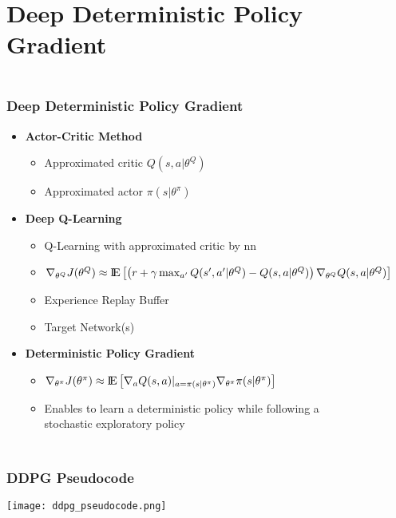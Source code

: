 \documentclass[accentcolor=tud1d,colorbacktitle,inverttitle,landscape,german,presentation,t]{tudbeamer}
\begin{document}
\section{Deep Deterministic Policy Gradient}
	\begin{frame}
		\frametitle{\\Deep Deterministic Policy Gradient}
		\begin{itemize}
			\item \textbf{Actor-Critic Method}
			\begin{itemize}
				\item Approximated critic $Q(s,a|\theta^Q)$
				\item Approximated actor $\pi(s|\theta^\pi)$
			\end{itemize}
			\vspace{2mm}
			\item \textbf{Deep Q-Learning}
			\begin{itemize}
				\item Q-Learning with approximated critic by nn
				\item $\nabla_{\theta^Q}J(\theta^Q)\approx{\rm I\!E} \left[\left(r+\gamma \max_{a'} Q(s', 
				a'|\theta^Q)-Q(s,a|\theta^Q)\right)\nabla_{\theta^Q}Q(s,a|\theta^Q)\right] $
				\item Experience Replay Buffer
				\item Target Network(s)
			\end{itemize}
			\vspace{2mm}
			\item \textbf{Deterministic Policy Gradient}
			\begin{itemize}
				\item $\nabla_{\theta^\pi}J(\theta^\pi)\approx {\rm I\!E}\left[\nabla_aQ(s,a)|_{a=\pi(s|\theta^\pi)} \nabla_{\theta^\pi}\pi(s|\theta^\pi)\right]$
				\item Enables to learn a deterministic policy while following a \\stochastic exploratory policy
			\end{itemize}
		\end{itemize}
	\end{frame}
	\begin{frame}
		\frametitle{\\DDPG Pseudocode}
		\centering
		\vspace{-4.5mm}
		\texttt{[image: ddpg\_pseudocode.png]}
	\end{frame}
\end{document}
